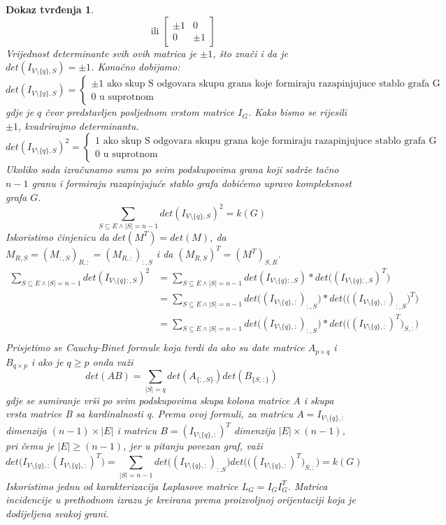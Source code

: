 \documentclass[11pt]{article}
\newtheorem*{custom_proof}{Dokaz tvrđenja}
\begin{document}
\begin{custom_proof}
\[		\text{ ili } \begin{bmatrix} \pm 1 &  0 \\ 0 & \pm 1 \end{bmatrix}
		\] 
		Vrijednost determinante svih ovih matrica je $\pm 1$, 
		što znači i da je $det(I_{V \setminus \{q\},S}) = \pm 1$.
		Konačno dobijamo:
		\[
		 det(I_{V \setminus \{q\},S}) = 
		\begin{cases}
		\pm 1 \text{ ako skup S odgovara skupu grana koje formiraju razapinjujuce stablo grafa G} \\
		0 \text{ u suprotnom }
		\end{cases} 
		\]
		gdje je $q$ čvor predstavljen posljednom vrstom matrice $I_G$. 
		Kako bismo se rijesili $\pm 1$, kvadrirajmo determinantu.
		\[
		 det(I_{V \setminus \{q\},S})^2 = 
		\begin{cases}
		1 \text{ ako skup S odgovara skupu grana koje formiraju razapinjujuce stablo grafa G}\\
		0 \text{ u suprotnom}
		\end{cases} 
		\]
		Ukoliko sada izračunamo sumu po svim podskupovima grana koji sadrže tačno $n-1$ granu i formiraju razapinjujuće stablo grafa dobićemo upravo kompleksnost grafa $G$.
		\[
		\sum_{S \subseteq E \land |S| = n -1}   det(I_{V \setminus \{q\},S})^2 = k(G)
		\]
		Iskoristimo činjenicu da $det(M^T) = det(M)$, da $M_{R,S} = (M_{:,S})_{R,:} = (M_{R,:})_{:,S}$ i da $(M_{R,S})^T = (M^T)_{S,R}$.
		\[
		\begin{split}
		\sum_{S \subseteq E \land |S| = n -1}   det(I_{V \setminus \{q\}:,S})^2  & =
		\sum_{S \subseteq E \land |S| = n -1}   det(I_{V \setminus \{q\}:,S}) * det\big((I_{V \setminus \{q\}:,S})^T\big) \\
		&  = \sum_{S \subseteq E \land |S| = n -1}   det\big((I_{V \setminus \{q\},:})_{:,S}\big) * det\Big(\big((I_{V \setminus \{q\},:})_{:,S}\big)^T\Big)\\
		&  = \sum_{S \subseteq E \land |S| = n -1}   det\big((I_{V \setminus \{q\},:})_{:,S}\big) * det\Big(\big((I_{V \setminus \{q\},:})^T\big)_{S,:}\Big)\\
		\end{split}
		\]
		Prisjetimo se Cauchy-Binet formule koja tvrdi da ako su date matrice $A_{p \times q}$ i $B_{q \times p}$ i ako je $q \geq p$ onda važi
		\[
			det(AB) = \sum_{|S| = q} det(A_{\{:,S\}}) det(B_{\{S,:\}})
		\]
		gdje se sumiranje vrši po svim podskupovima skupa kolona matrice A i skupa vrsta matrice B sa kardinalnosti q.
		Prema ovoj formuli, za matricu $A = I_{V \setminus \{q\},:}$ dimenzija $(n - 1) \times |E|$ i matricu $B = (I_{V \setminus \{q\},:})^T$ dimenzija $|E| \times (n - 1)$, pri čemu je $|E| \geq (n-1)$, jer u pitanju
		povezan graf, važi
		\[
		det \big(I_{V \setminus \{q\},:} (I_{V \setminus \{q\},:})^T\big) = \sum_{|S| = n - 1} det\big((I_{V \setminus \{q\},:})_{:.S}\big) det\Big(\big((I_{V \setminus \{q\},:})^T\big)_{S,:}\Big) = k(G)
		\] 
		Iskoristimo jednu od karakterizacija Laplasove matrice $L_G = I_G I_G^T$.
		Matrica incidencije u prethodnom izrazu je kreirana prema proizvoljnoj orijentaciji koja je dodijeljena svakoj grani.
		

\end{custom_proof}
\end{document}

